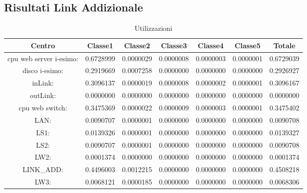 \subsection{Risultati Link Addizionale}
\begin{table}[H]
\begin{center}\begin{scriptsize}
\begin{tabular}{||c|c|c|c|c|c|c||}
\hline
Centro &Classe1 &Classe2 &Classe3 &Classe4 &Classe5 &Totale\\
\hline
\hline
 cpu web server i-esimo: 	&0.6728999	&0.0000029	&0.0000008	&0.0000003	&0.0000001	&0.6729039\\
\hline
 disco i-esimo: 	&0.2919669	&0.0007258	&0.0000000	&0.0000000	&0.0000000	&0.2926927\\
\hline
 inLink: 	&0.3096137	&0.0000019	&0.0000008	&0.0000002	&0.0000001	&0.3096167\\
\hline
 outLink: 	&0.0000000	&0.0000000	&0.0000000	&0.0000000	&0.0000000	&0.0000000\\
\hline
 cpu web switch: 	&0.3475369	&0.0000022	&0.0000009	&0.0000003	&0.0000001	&0.3475402\\
\hline
 LAN: 	&0.0090707	&0.0000001	&0.0000000	&0.0000000	&0.0000000	&0.0090708\\
\hline
 LS1: 	&0.0139326	&0.0000001	&0.0000000	&0.0000000	&0.0000000	&0.0139327\\
\hline
 LS2:	&0.0090707	&0.0000001	&0.0000000	&0.0000000	&0.0000000	&0.0090708\\
\hline
 LW2: 	&0.0001374	&0.0000000	&0.0000000	&0.0000000	&0.0000000	&0.0001374\\
\hline
 LINK\_ADD: 	&0.4496003	&0.0012215	&0.0000000	&0.0000000	&0.0000000	&0.4508218\\
\hline
 LW3: 	&0.0068121	&0.0000185	&0.0000000	&0.0000000	&0.0000000	&0.0068306\\
\hline
\end{tabular}
\end{scriptsize}\end{center}
\caption{Utilizzazioni}
\label{utilizzazioni}
\end{table}

